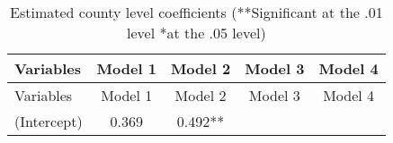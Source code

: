 \documentclass[12pt,twoside]{reedthesis}
\begin{document}
  \begin{longtable}[]{@{}lcccc@{}}
  \caption{Estimated county level coefficients (**Significant at the .01
  level *at the .05 level) \label{tab:county_coef}}\tabularnewline
  \toprule
  \begin{minipage}[b]{0.26\columnwidth}\raggedright\strut
  Variables\strut
  \end{minipage} & \begin{minipage}[b]{0.12\columnwidth}\centering\strut
  Model 1\strut
  \end{minipage} & \begin{minipage}[b]{0.13\columnwidth}\centering\strut
  Model 2\strut
  \end{minipage} & \begin{minipage}[b]{0.14\columnwidth}\centering\strut
  Model 3\strut
  \end{minipage} & \begin{minipage}[b]{0.14\columnwidth}\centering\strut
  Model 4\strut
  \end{minipage}\tabularnewline
  \midrule
  \endfirsthead
  \toprule
  \begin{minipage}[b]{0.26\columnwidth}\raggedright\strut
  Variables\strut
  \end{minipage} & \begin{minipage}[b]{0.12\columnwidth}\centering\strut
  Model 1\strut
  \end{minipage} & \begin{minipage}[b]{0.13\columnwidth}\centering\strut
  Model 2\strut
  \end{minipage} & \begin{minipage}[b]{0.14\columnwidth}\centering\strut
  Model 3\strut
  \end{minipage} & \begin{minipage}[b]{0.14\columnwidth}\centering\strut
  Model 4\strut
  \end{minipage}\tabularnewline
  \midrule
  \endhead
  \begin{minipage}[t]{0.26\columnwidth}\raggedright\strut
  (Intercept)\strut
  \end{minipage} & \begin{minipage}[t]{0.12\columnwidth}\centering\strut
  0.369\strut
  \end{minipage} & \begin{minipage}[t]{0.13\columnwidth}\centering\strut
  0.492**\strut
  \end{minipage} & \begin{minipage}[t]{0.14\columnwidth}\centering\strut

\end{minipage}
\end{longtable}
\end{document}
